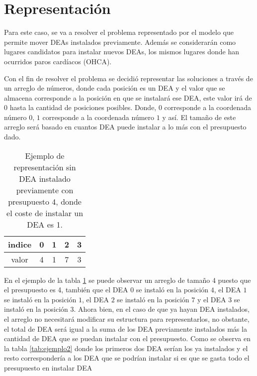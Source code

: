 \documentclass[letter, 10pt]{article}
\begin{document}
\section{Representaci\'on}

Para este caso, se va a resolver el problema representado por el modelo que permite mover DEAs instalados previamente. Adem\'as se considerar\'an como lugares candidatos para instalar nuevos DEAs, los mismos lugares donde han ocurridos paros card\'iacos (OHCA).

Con el fin de resolver el problema se decidi\'o representar las soluciones a trav\'es de un arreglo de n\'umeros, donde cada posici\'on es un DEA y el valor que se almacena corresponde a la posici\'on en que se instalar\'a ese DEA, este valor ir\'a de $0$ hasta la cantidad de posiciones posibles. Donde, $0$ corresponde a la coordenada n\'umero $0$, $1$ corresponde a la coordenada n\'umero $1$ y as\'i. El tama\~no de este arreglo ser\'a basado en cuantos DEA puede instalar a lo m\'as con el presupuesto dado.

\begin{table}[h!]
    \centering
    \begin{tabular}{|c|c|c|c|c|}
    \hline
    indice & 0 & 1 & 2 & 3\\
    \hline
    valor & 4 & 1 & 7 & 3\\
    \hline
    \end{tabular}
    \caption{Ejemplo de representaci\'on sin DEA instalado previamente con presupuesto 4, donde el coste de instalar un DEA es 1.}
    \label{tab:ejemplo1}
\end{table}

En el ejemplo de la tabla \ref{tab:ejemplo1} se puede observar un arreglo de tama\~no 4 puesto que el presupuesto es 4, tambi\'en que el DEA $0$ se instal\'o en la posici\'on $4$, el DEA $1$ se instal\'o en la posici\'on $1$, el DEA $2$ se instal\'o en la posici\'on $7$ y el DEA $3$ se instal\'o en la posici\'on $3$. Ahora bien, en el caso de que ya hayan DEA instalados, el arreglo no necesitar\'a modificar su estructura para representarlos, no obstante, el total de DEA ser\'a igual a la suma de los DEA previamente instalados m\'as la cantidad de DEA que se puedan instalar con el presupuesto. Como se observa en la tabla \ref{tab:ejemplo2} donde los primeros dos DEA ser\'ian los ya instalados y el resto corresponder\'ia a los DEA que se podr\'ian instalar si es que se gasta todo el presupuesto en instalar DEA
\end{document}

